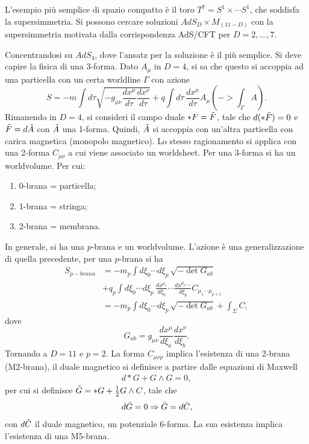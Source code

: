 L'esempio più semplice di spazio compatto è il toro $T^7 = S^1 \times \cdots S^1$, che soddisfa la supersimmetria. Si possono cercare soluzioni $AdS_D \times M_{(11 - D)}$ con la supersimmetria motivata dalla corrispondenza AdS/CFT per $D = 2,\dots,7$. 

Concentrandosi su $AdS_4$, dove l'ansatz per la soluzione è il più semplice. Si deve capire la fisica di una 3-forma. Dato $A_\mu$ in $D = 4$, si sa che questo si accoppia ad una particella con un certa worldline $\Gamma$ con azione 
\begin{equation}
    S = -m\int d\tau\sqrt{-g_{\mu\nu}\frac{dx^\mu}{d\tau}\frac{dx^\nu}{d\tau}} + q\int d\tau\,\frac{dx^\mu}{d\tau}A_\mu (-> \int_\Gamma A).
\end{equation}
Rimanendo in $D = 4$, si consideri il campo duale $*F = \tilde{F}$, tale che $d(*\tilde{F}) = 0$ e $\tilde{F} = d\tilde{A}$ con $\tilde{A}$ una 1-forma. Quindi, $\tilde{A}$ si accoppia con un'altra particella con carica magnetica (monopolo magnetico). Lo stesso ragionamento si applica con una 2-forma $C_{\mu\nu}$ a cui viene associato un worldsheet. Per una 3-forma si ha un worldvolume. Per cui:
\begin{enumerate}
    \item 0-brana = particella;
    \item 1-brana = stringa;
    \item 2-brana = membrana.
\end{enumerate}
In generale, si ha una $p$-brana e un worldvolume. L'azione è una generalizzazione di quella precedente, per una $p$-brana si ha 
\begin{equation}
    \begin{split}
        S_{p-brana} &= -m_p\int d\xi_0\cdots d\xi_p\,\sqrt{-\det{G_{ab}}} \\
        &+ q_p\int d\xi_0\cdots d\xi_p\,\frac{dx^{\mu_1}}{d\xi_0}\cdots \frac{dx^{\mu_{p+1}}}{d\xi_p}C_{\mu_1\cdots\mu_{p+1}} \\
        &= -m_p\int d\xi_0\cdots d\xi_p\,\sqrt{-\det{G_{ab}}} + \int_\Sigma C,
    \end{split} 
\end{equation}
dove 
\begin{equation}
    G_{ab} = g_{\mu\nu}\frac{dx^\mu}{d\xi_a}\frac{dx^\nu}{d\xi_b}.
\end{equation}
Tornando a $D = 11$ e $p = 2$. La forma $C_{\mu\nu\rho}$ implica l'esistenza di una 2-brana (M2-brana), il duale magnetico si definisce a partire dalle equazioni di Maxwell
\begin{eqnarray}
    d*G + G \wedge G = 0,
\end{eqnarray}
per cui si definisce $\tilde{G} = *G + \frac{1}{2} G \wedge C$, tale che 
\begin{equation}
    d\tilde{G} = 0 \Rightarrow \tilde{G} = d\tilde{C},
\end{equation}
con $d\tilde{C}$ il duale magnetico, un potenziale 6-forma. La sua esistenza implica l'esistenza di una M5-brana. 

